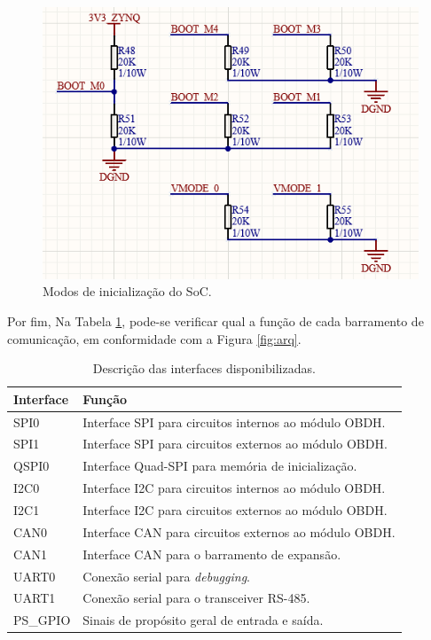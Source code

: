 \begin{figure}[H]
    \centering
    \includegraphics[scale=0.8]{images/bootmode.png}
    \caption{Modos de inicialização do SoC.}
    \label{fig:boot}
\end{figure}

Por fim, Na Tabela \ref{tab:interfaces}, pode-se verificar qual a função de cada barramento de comunicação, em conformidade com a Figura \ref{fig:arq}. 

\begin{table}[H]
	\ABNTEXfontereduzida
	\caption{\label{tab:interfaces}Descrição das interfaces disponibilizadas.}
    \centering
    \begin{tabular}{@{} >{\centering}p{4cm} >{\centering}p{8cm} @{}}
    
		\toprule
		\textbf{Interface} & \textbf{Função} \tabularnewline 
        \midrule
         SPI0 & Interface SPI para circuitos internos ao módulo OBDH. \tabularnewline
        \midrule
         SPI1 & Interface SPI para circuitos externos ao módulo OBDH.  \tabularnewline
        \midrule
         QSPI0 & Interface Quad-SPI para memória de inicialização. \tabularnewline
        \midrule
        I2C0  & Interface I2C para circuitos internos ao módulo OBDH. \tabularnewline
        \midrule
        I2C1  & Interface I2C para circuitos externos ao módulo OBDH.  \tabularnewline
        \midrule
        CAN0 & Interface CAN para circuitos externos ao módulo OBDH. \tabularnewline
        \midrule
        CAN1 & Interface CAN para o barramento de expansão. \tabularnewline
        \midrule
         UART0 & Conexão serial para \textit{debugging}. \tabularnewline
        \midrule
         UART1 & Conexão serial para o transceiver RS-485. \tabularnewline
        \midrule
         PS\_GPIO & Sinais de propósito geral de entrada e saída. \tabularnewline

        \bottomrule
	\end{tabular}
\end{table}

